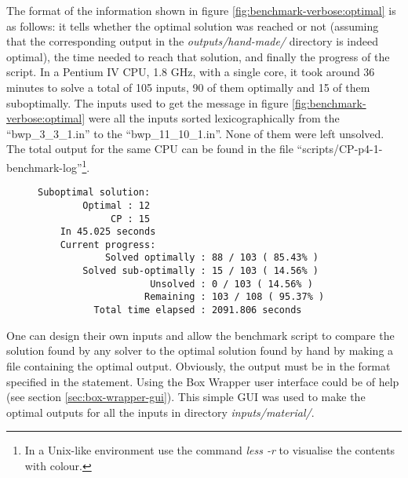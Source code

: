 The format of the information shown in figure \ref{fig:benchmark-verbose:optimal}
is as follows: it tells whether the optimal solution was reached or not (assuming
that the corresponding output in the \textit{outputs/hand-made/} directory is indeed
optimal), the time needed to reach that solution, and finally the progress of the
script. In a Pentium IV CPU, 1.8 GHz, with a single core, it took around 36 minutes
to solve a total of 105 inputs, 90 of them optimally and 15 of them suboptimally.
The inputs used to get the message in figure \ref{fig:benchmark-verbose:optimal} were
all the inputs sorted lexicographically from the ``bwp\_3\_3\_1.in'' to the
``bwp\_11\_10\_1.in''. None of them were left unsolved. The total output for the
same CPU can be found in the file ``scripts/CP-p4-1-benchmark-log''\footnote{ In a
Unix-like environment use the command \textit{less -r} to visualise the contents with colour.}.

\begin{figure}[H]
\centering
{\scriptsize
\begin{BVerbatim}
Suboptimal solution:
        Optimal : 12
             CP : 15
    In 45.025 seconds
    Current progress:
            Solved optimally : 88 / 103 ( 85.43%
        Solved sub-optimally : 15 / 103 ( 14.56%
                    Unsolved : 0 / 103 ( 14.56%
                   Remaining : 103 / 108 ( 95.37%
          Total time elapsed : 2091.806 seconds

\end{BVerbatim}
}
\label{fig:benchmark-verbose:suboptimal}
\end{figure}

One can design their own inputs and allow the benchmark script to compare
the solution found by any solver to the optimal solution found by hand by
making a file containing the optimal output. Obviously, the output must
be in the format specified in the statement. Using the Box Wrapper user
interface could be of help (see section \ref{sec:box-wrapper-gui}).
This simple GUI was used to make the optimal outputs for all the inputs
in directory \textit{inputs/material/}.

\hfill

